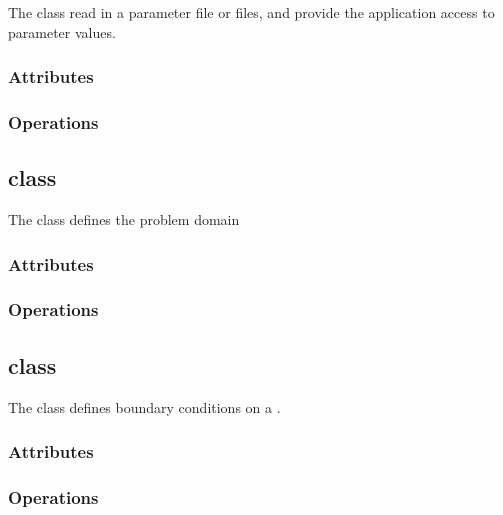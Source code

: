 \documentclass{article}
\begin{document}
The  class read in a parameter file or files, and
provide the application access to parameter values.


\subsubsection{Attributes}

\subsubsection{Operations}

\subsection{ class}

The  class defines the problem domain


\subsubsection{Attributes}

\subsubsection{Operations}

\subsection{ class}

The  class defines boundary conditions on a .



\subsubsection{Attributes}

\subsubsection{Operations}

\end{document}
